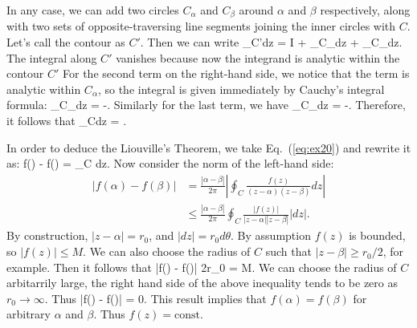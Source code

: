 \documentclass[10pt, letterpaper]{article}
\newcommand{\cint}[1]{\frac{1}{2\pi i}\oint_{#1}}
\begin{document}
\begin{itemize}
	In any case, we can add two circles $C_\alpha$ and $C_\beta$ around $\alpha$ and $\beta$ respectively, along
	with two sets of opposite-traversing line segments joining the inner circles with $C$. Let's call the contour
	as $C'$. Then we can write
	\be
		\cint{C'}dz = 
			I + \cint{C_\alpha}dz
			  + \cint{C_\beta}dz. \nonumber
	\ee
	The integral along $C'$ vanishes because now the integrand is analytic within the contour $C'$
	For the second term on the right-hand side, we notice that the term 
	\be
		 \nonumber
	\ee
	is analytic within $C_\alpha$, so the integral is given immediately by Cauchy's integral formula:
	\be
		\cint{C_\alpha}dz = -. \nonumber
	\ee
	Similarly for the last term, we have
	\be
		\cint{C_\beta}dz = -. \nonumber
	\ee
	Therefore, it follows that
	\be
		\cint{C}dz = .
		\label{eq:ex20}
	\ee

	In order to deduce the Liouville's Theorem, we take Eq.~(\ref{eq:ex20}) and rewrite it as:
	\be
		f(\alpha) - f(\beta) = \oint_C dz. \nonumber
	\ee
	Now consider the norm of the left-hand side:
	\begin{align}
		\left|f(\alpha) - f(\beta)\right| 
			&= \frac{|\alpha - \beta|}{2\pi}\left| \oint_C \frac{f(z)}{(z-\alpha)(z-\beta)}dz \right| \nonumber\\
			&\leq \frac{|\alpha - \beta|}{2\pi} \oint_C \frac{|f(z)|}{|z-\alpha||z-\beta|}|dz|. \nonumber
	\end{align}
	By construction, $|z-\alpha| = r_0$, and $|dz|=r_0d\theta$. By assumption $f(z)$ is bounded, so $|f(z)| \leq M$.
	We can also choose the radius of $C$ such that $|z-\beta| \geq r_0/2$, for example. Then it follows that
	\be
		|f(\alpha) - f(\beta)| 
			\leq {} 2\pi r_0
			= M. \nonumber
	\ee
	We can choose the radius of $C$ arbitarrily large, the right hand side of the above inequality tends to be zero
	as $r_0\rightarrow\infty$. Thus
	\be
		|f(\alpha) - f(\beta)| = 0.
	\ee
	This result implies that $f(\alpha)=f(\beta)$ for arbitrary $\alpha$ and $\beta$. Thus $f(z)=\mbox{const.}$


\end{itemize}
\end{document}
